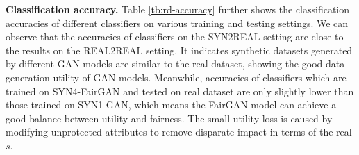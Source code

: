 \documentclass[sigconf]{acmart}
\theoremstyle{definition}
\begin{document}
{\bf \noindent Classification accuracy.}
Table \ref{tb:rd-accuracy} further shows the classification accuracies of different classifiers on various training and testing settings. We can observe that the accuracies of classifiers on the SYN2REAL setting are close to the results on the REAL2REAL setting. It indicates synthetic datasets generated by different GAN models are similar to the real dataset, showing the good data generation utility of GAN models.  Meanwhile, accuracies of classifiers which are trained on SYN4-FairGAN and tested on real dataset are only slightly lower than those trained on SYN1-GAN, which means the FairGAN model can achieve a good balance between utility and fairness. The small utility loss is caused by modifying unprotected attributes to remove disparate impact in terms of the real $s$. 

\end{document}
